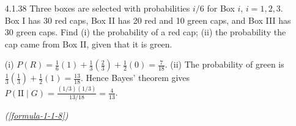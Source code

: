 \begin{enumerate}[label={},leftmargin=1.15cm,labelwidth=1.0cm,labelsep=0.15cm,itemindent=0pt,listparindent=0pt,itemsep=\baselineskip,parsep=0pt,topsep=0pt]
The equations give
\begin{equation*}
A=\begin{bmatrix}1&1&-1\\2&3&1\\-3&1&7\end{bmatrix},\quad
X=\begin{bmatrix}l\\b\\h\end{bmatrix},\quad
B=\begin{bmatrix}3\\10\\-1\end{bmatrix}.
\tag*{(\ref{formula-1-1-1})}\end{equation*}
$\det A=-8\ne0$, so $A^{-1}$ exists. Solving gives $(l,b,h)=(3,1,1)$ cm. For part (a),
\[
A^{-1}=\begin{bmatrix}-5/2&1&-1/2\\17/8&-1/2&3/8\\-11/8&1/2&-1/8\end{bmatrix};
\]
for part (b),
\[
A^2+7I=\begin{bmatrix}13&3&-7\\5&19&8\\-22&7&60\end{bmatrix}.
\]
The Python code computes the dimensions, determinant, inverse and alternative matrix expression.
\begin{lstlisting}[frame=single, basicstyle=\rmfamily, escapeinside={(*@}{@*)}]
(*@\makebox[\dimexpr\linewidth-2\fboxsep-2\fboxrule\relax][c]{codes/4.1.37.py}@*)
\end{lstlisting}

\item[4.1.38] Three boxes are selected with probabilities $i/6$ for Box $i$, $i=1,2,3$. Box I has 30 red caps, Box II has 20 red and 10 green caps, and Box III has 30 green caps. Find (i) the probability of a red cap; (ii) the probability the cap came from Box II, given that it is green.

\vspace{0.6em}\par\solution


(i) $P(R)=\frac16(1)+\frac13(\frac23)+\frac12(0)=\boxed{\frac7{18}}$. (ii) The probability of green is $\frac13(\frac13)+\frac12(1)=\frac{13}{18}$. Hence Bayes' theorem gives $P(\text{II}\mid G)=\frac{(1/3)(1/3)}{13/18}=\boxed{\frac4{13}}$.
\par\noindent\hfill\mbox{\textit{(\ref{formula-1-1-8})}}\par\end{enumerate}